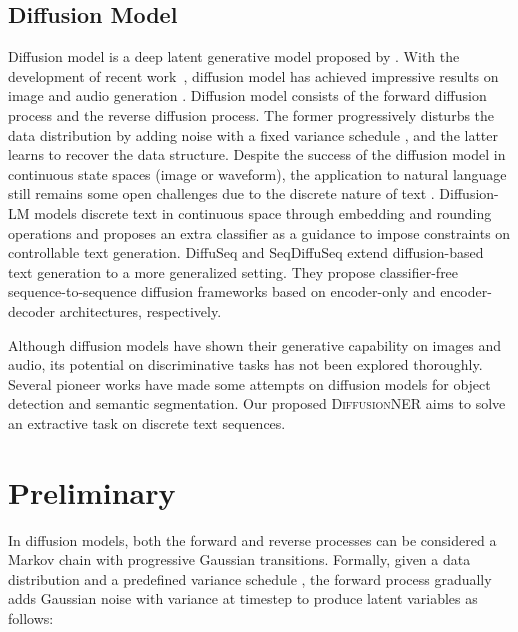 \documentclass[11pt]{article}
\begin{document}
\subsection{Diffusion Model}
Diffusion model is a deep latent generative model proposed by \citep{pmlr-v37-sohl-dickstein15}. With the development of recent work~\citep{ddpm}, diffusion model has achieved impressive results on image and audio generation \citep{rombach2021highresolution, dalle2, kong2021diffwave}. Diffusion model consists of the forward diffusion process and the reverse diffusion process. The former progressively disturbs the data distribution by adding noise with a fixed variance schedule \citep{ddpm}, and the latter learns to recover the data structure. Despite the success of the diffusion model in continuous state spaces (image or waveform), the application to natural language still remains some open challenges due to the discrete nature of text \citep{NEURIPS2021_958c5305, hoogeboom2022autoregressive, Self_conditioned_Embedding_Diffusion, DiffusionBERT}. Diffusion-LM \citep{Li-2022-DiffusionLM} models discrete text in continuous space through embedding and rounding operations and proposes an extra classifier as a guidance to impose constraints on controllable text generation. DiffuSeq \citep{gong2022diffuseq} and SeqDiffuSeq \citep{SeqDiffuSeq} extend diffusion-based text generation to a more generalized setting. They propose classifier-free sequence-to-sequence diffusion frameworks based on encoder-only and encoder-decoder architectures, respectively. 

Although diffusion models have shown their generative capability on images and audio, its potential on discriminative tasks has not been explored thoroughly.
Several pioneer works \citep{SegDiff, baranchuk2022labelefficient, diffusiondet} have made some attempts on diffusion models for object detection and semantic segmentation.
Our proposed \textsc{DiffusionNER} aims to  solve an extractive task on discrete text sequences.



\section{Preliminary}
\label{sec:3.1}

In diffusion models, both the forward and reverse processes can be considered a Markov chain with progressive Gaussian transitions. Formally, given a data distribution  and a predefined variance schedule , the forward process  gradually adds Gaussian noise with variance  at timestep  to produce latent variables  as follows:
\end{document}
